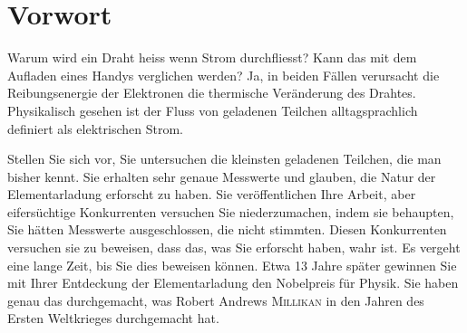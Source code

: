 \chapter*{Vorwort}\label{cha:vorwort}
Warum wird ein Draht heiss wenn Strom durchfliesst? Kann das mit dem Aufladen eines Handys verglichen werden? Ja, in beiden Fällen verursacht die Reibungsenergie der Elektronen die thermische Veränderung des Drahtes. Physikalisch gesehen ist der Fluss von geladenen Teilchen alltagsprachlich definiert als elektrischen Strom.

Stellen Sie sich vor, Sie untersuchen die kleinsten geladenen Teilchen, die man bisher kennt. Sie erhalten sehr genaue Messwerte und glauben, die Natur der Elementarladung erforscht zu haben. Sie veröffentlichen Ihre Arbeit, aber eifersüchtige Konkurrenten versuchen Sie niederzumachen, indem sie behaupten, Sie hätten Messwerte ausgeschlossen, die nicht stimmten.  Diesen Konkurrenten versuchen sie zu beweisen, dass das, was Sie erforscht haben, wahr ist. Es vergeht eine lange Zeit, bis Sie dies beweisen können. Etwa 13 Jahre später gewinnen Sie mit Ihrer Entdeckung der Elementarladung den Nobelpreis für Physik. Sie haben genau das durchgemacht, was Robert Andrews {\scshape Millikan} in den Jahren des Ersten Weltkrieges durchgemacht hat.